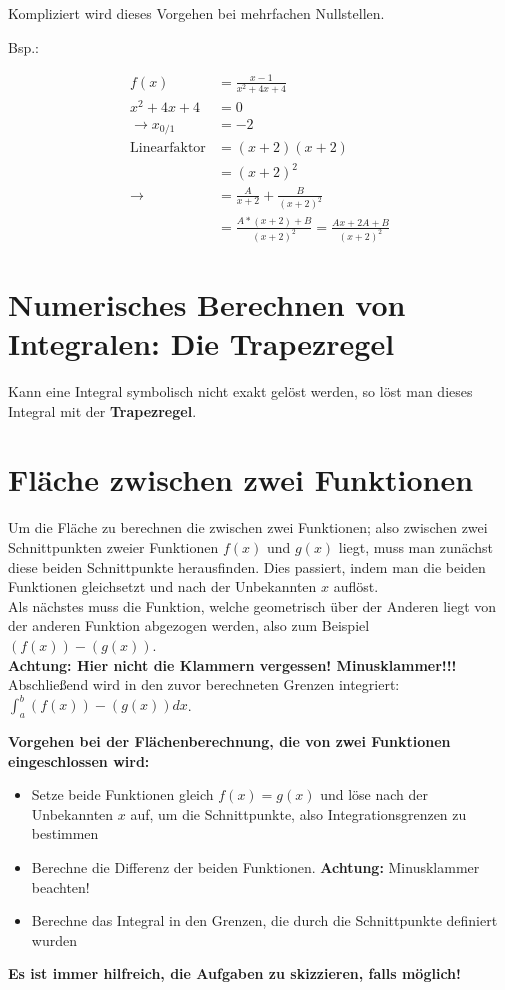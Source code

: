 \documentclass[12pt, a4paper]{scrreprt}
\begin{document}
Kompliziert wird dieses Vorgehen bei mehrfachen Nullstellen.

Bsp.:

\begin{align*}
  f(x) &= \frac{x-1}{x^2+4x+4}\\[1em]
  x^2+4x+4 &= 0\\[1em]
  \rightarrow x_{0/1} &= -2\\[1em]
  \text{Linearfaktor} &= (x+2)(x+2)\\[1em]
       &= {(x+2)}^2\\[1em]
  \rightarrow &= \frac{A}{x+2} + \frac{B}{{(x+2)}^2}\\[1em]
  &= \frac{A * (x+2) + B}{{(x+2)}^2} = \frac{Ax + 2A + B}{{(x+2)}^2}
\end{align*}

\section{Numerisches Berechnen von Integralen: Die Trapezregel}

Kann eine Integral symbolisch nicht exakt gelöst werden, so löst man dieses Integral mit der \textbf{Trapezregel}.

\section{Fläche zwischen zwei Funktionen}

Um die Fläche zu berechnen die zwischen zwei Funktionen; also zwischen zwei Schnittpunkten zweier Funktionen \(f(x)\) und \(g(x)\) liegt, muss man zunächst diese beiden Schnittpunkte herausfinden. Dies passiert, indem man die beiden Funktionen gleichsetzt und nach der Unbekannten \(x\) auflöst.\\
Als nächstes muss die Funktion, welche geometrisch \glqq{} über \grqq{} der Anderen liegt von der anderen Funktion abgezogen werden, also zum Beispiel \((f(x)) - (g(x))\).\\
\myhspace{} \textbf{Achtung: Hier nicht die Klammern vergessen! Minusklammer!!!}\\
Abschließend wird in den zuvor berechneten Grenzen integriert: \(\int_a^b (f(x)) - (g(x)) dx\).

\begin{framed}
  \textbf{Vorgehen bei der Flächenberechnung, die von zwei Funktionen eingeschlossen wird:}

  \begin{itemize}
  \item Setze beide Funktionen gleich \(f(x) = g(x)\) und löse nach der Unbekannten \(x\) auf, um die Schnittpunkte, also Integrationsgrenzen zu bestimmen
  \item Berechne die Differenz der beiden Funktionen. \textbf{Achtung:} Minusklammer beachten!
  \item Berechne das Integral in den Grenzen, die durch die Schnittpunkte definiert wurden
  \end{itemize}

  \textbf{Es ist immer hilfreich, die Aufgaben zu skizzieren, falls möglich!}
\end{framed}
\end{document}
